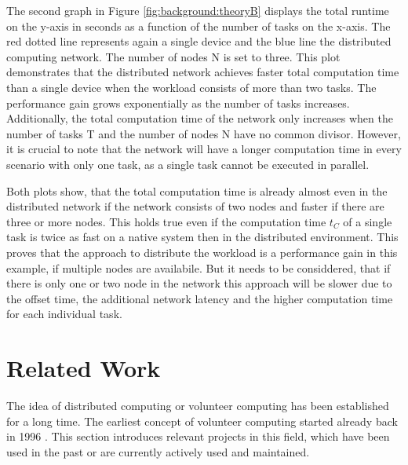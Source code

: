 The second graph in Figure \ref{fig:background:theoryB} displays the total runtime on the y-axis in seconds as a function of the number of tasks on the x-axis. The red dotted line represents again a single device and the blue line the distributed computing network. The number of nodes N is set to three. This plot demonstrates that the distributed network achieves faster total computation time than a single device when the workload consists of more than two tasks. The performance gain grows exponentially as the number of tasks increases. Additionally, the total computation time of the network only increases when the number of tasks T and the number of nodes N have no common divisor. However, it is crucial to note that the network will have a longer computation time in every scenario with only one task, as a single task cannot be executed in parallel.

Both plots show, that the total computation time is already almost even in the distributed network if the network consists of two nodes and faster if there are three or more nodes. This holds true even if the computation time $t_{C}$ of a single task is twice as fast on a native system then in the distributed environment. This proves that the approach to distribute the workload is a performance gain in this example, if multiple nodes are availabile. But it needs to be considdered, that if there is only one or two node in the network this approach will be slower due to the offset time, the additional network latency and the higher computation time for each individual task.


\section{Related Work}
\label{sec:background:related_work}
The idea of distributed computing or volunteer computing has been established for a long time. The earliest concept of volunteer computing started already back in 1996 \cite{relatedwork:boinc1}. This section introduces relevant projects in this field, which have been used in the past or are currently actively used and maintained.   
